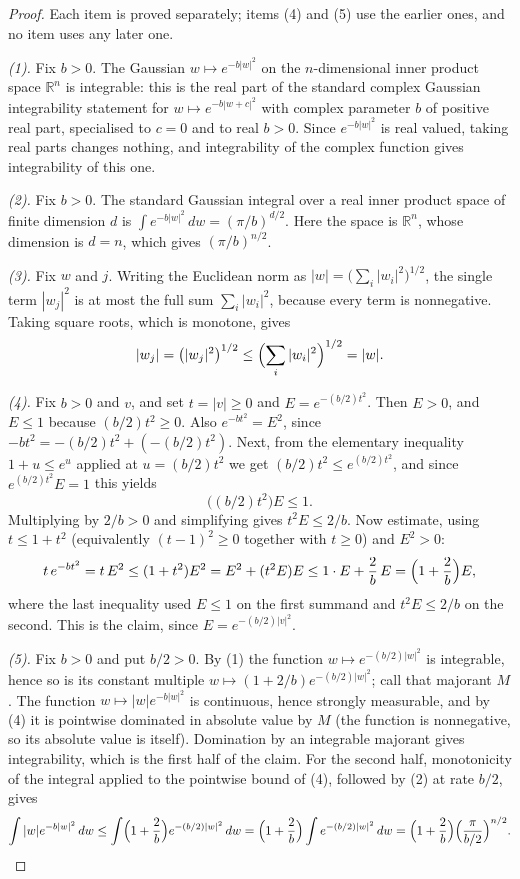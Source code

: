 \begin{proof}
Each item is proved separately; items (4) and (5) use the earlier ones, and no item
uses any later one.

\emph{(1).}  Fix $b > 0$.  The Gaussian $w \mapsto e^{-b|w|^2}$ on the $n$-dimensional
inner product space $\mathbb{R}^n$ is integrable: this is the real part of the standard
complex Gaussian integrability statement for $w \mapsto e^{-b|w + c|^2}$ with complex
parameter $b$ of positive real part, specialised to $c = 0$ and to real $b > 0$.  Since
$e^{-b|w|^2}$ is real valued, taking real parts changes nothing, and integrability of
the complex function gives integrability of this one.

\emph{(2).}  Fix $b > 0$.  The standard Gaussian integral over a real inner product
space of finite dimension $d$ is
$\int e^{-b|w|^2}\,dw = (\pi/b)^{d/2}$.  Here the space is $\mathbb{R}^n$, whose
dimension is $d = n$, which gives $(\pi/b)^{n/2}$.

\emph{(3).}  Fix $w$ and $j$.  Writing the Euclidean norm as
$|w| = \bigl(\sum_i |w_i|^2\bigr)^{1/2}$, the single term $|w_j|^2$ is at most the full
sum $\sum_i |w_i|^2$, because every term is nonnegative.  Taking square roots, which is
monotone, gives
\[
  |w_j| = \bigl(|w_j|^2\bigr)^{1/2} \leq \Bigl(\sum_i |w_i|^2\Bigr)^{1/2} = |w| .
\]

\emph{(4).}  Fix $b > 0$ and $v$, and set $t = |v| \geq 0$ and
$E = e^{-(b/2)t^2}$.  Then $E > 0$, and $E \leq 1$ because $(b/2)t^2 \geq 0$.  Also
$e^{-bt^2} = E^2$, since $-bt^2 = -(b/2)t^2 + (-(b/2)t^2)$.  Next, from the elementary
inequality $1 + u \leq e^u$ applied at $u = (b/2)t^2$ we get
$(b/2)t^2 \leq e^{(b/2)t^2}$, and since $e^{(b/2)t^2}E = 1$ this yields
\[
  \bigl((b/2)t^2\bigr)E \leq 1 .
\]
Multiplying by $2/b > 0$ and simplifying gives $t^2 E \leq 2/b$.  Now estimate, using
$t \leq 1 + t^2$ (equivalently $(t-1)^2 \geq 0$ together with $t \ge 0$) and $E^2 > 0$:
\[
  t\,e^{-bt^2} = t\,E^2 \leq (1 + t^2)E^2 = E^2 + (t^2E)E
    \leq 1 \cdot E + \frac{2}{b}\,E = \Bigl(1 + \frac{2}{b}\Bigr)E ,
\]
where the last inequality used $E \leq 1$ on the first summand and $t^2E \leq 2/b$ on
the second.  This is the claim, since $E = e^{-(b/2)|v|^2}$.

\emph{(5).}  Fix $b > 0$ and put $b/2 > 0$.  By (1) the function
$w \mapsto e^{-(b/2)|w|^2}$ is integrable, hence so is its constant multiple
$w \mapsto (1 + 2/b)e^{-(b/2)|w|^2}$; call that majorant $M$.  The function
$w \mapsto |w|e^{-b|w|^2}$ is continuous, hence strongly measurable, and by (4) it is
pointwise dominated in absolute value by $M$ (the function is nonnegative, so its
absolute value is itself).  Domination by an integrable majorant gives integrability,
which is the first half of the claim.  For the second half, monotonicity of the integral
applied to the pointwise bound of (4), followed by (2) at rate $b/2$, gives
\[
  \int |w|e^{-b|w|^2}\,dw
    \leq \int \Bigl(1 + \frac{2}{b}\Bigr)e^{-(b/2)|w|^2}\,dw
    = \Bigl(1 + \frac{2}{b}\Bigr)\int e^{-(b/2)|w|^2}\,dw
    = \Bigl(1 + \frac{2}{b}\Bigr)\Bigl(\frac{\pi}{b/2}\Bigr)^{n/2} .
\]


\end{proof}
